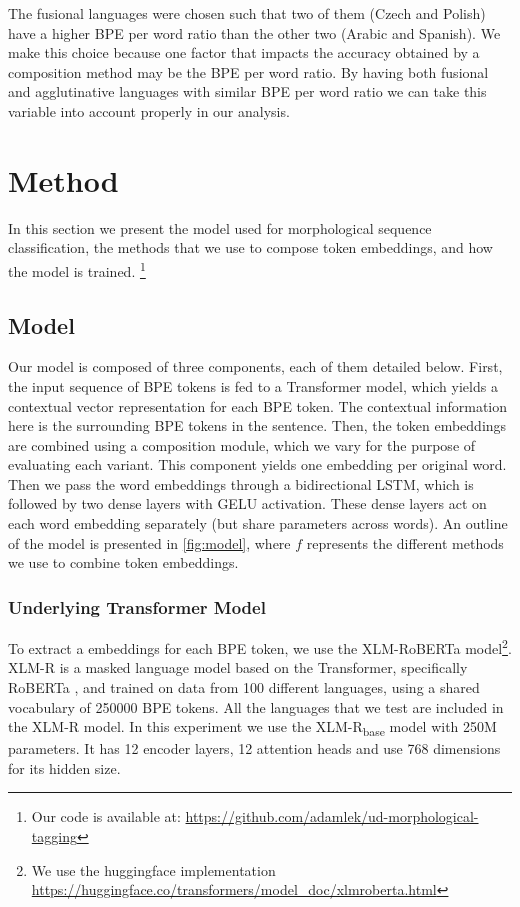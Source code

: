 \documentclass[11pt]{article}
\newcommand\citep{\cite}
\begin{document}
            The fusional languages were chosen such that two of them
     (Czech and Polish) have a higher BPE per word ratio than the
     other two (Arabic and Spanish). We make this choice because one
     factor that impacts the accuracy obtained by a composition method
     may be the BPE per word ratio.  By having both fusional and
     agglutinative languages with similar BPE per word ratio we can
     take this variable into account properly in our analysis.
        
	\section{Method}
	\label{method}
        	In this section we present the model used for
     morphological sequence classification, the methods that we use to
     compose token embeddings, and how the model is
     trained. \footnote{Our code is available at:
     \url{https://github.com/adamlek/ud-morphological-tagging}}

	\subsection{Model}

                Our model is composed of three components, each of
     them detailed below. First, the input sequence of BPE tokens is
     fed to a Transformer model, which yields a contextual vector
     representation for each BPE token. The contextual information
     here is the surrounding BPE tokens in the sentence.  Then, the
     token embeddings are combined using a composition module, which
     we vary for the purpose of evaluating each variant. This
     component yields one embedding per original word. Then we pass
     the word embeddings through a bidirectional LSTM, which is
     followed by two dense layers with GELU
     \citep{hendrycks2016gaussian} activation. These dense layers act
     on each word embedding separately (but share parameters across
     words).  An outline of the model is presented in
     \cref{fig:model}, where $f$ represents the different methods we
     use to combine token embeddings.

	\subsubsection{Underlying Transformer Model}
         To extract a embeddings for each BPE token, we use the
     XLM-RoBERTa \cite{conneau2019unsupervised} model\footnote{We use
     the huggingface implementation
     \url{https://huggingface.co/transformers/model_doc/xlmroberta.html}}. XLM-R
     is a masked language model based on the Transformer, specifically
     RoBERTa \citep{liu2019roberta}, and trained on data from 100
     different languages, using a shared vocabulary of 250000 BPE
     tokens. All the languages that we test are included in the XLM-R
     model. In this experiment we use the XLM-R\textsubscript{base} model
     with 250M parameters. It has 12 encoder layers, 12 attention
     heads and use 768 dimensions for its hidden size.
\end{document}
